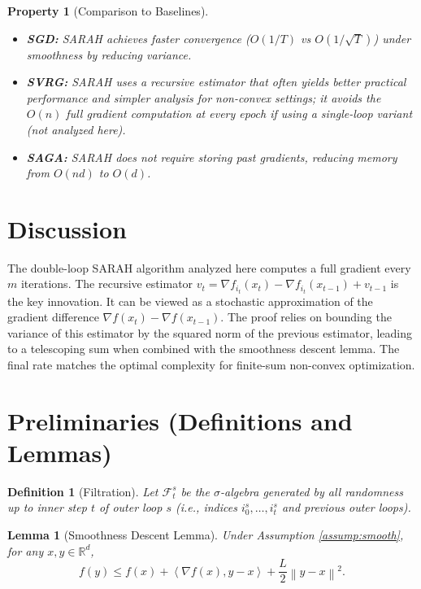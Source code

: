 \documentclass{article}
\newtheorem{lemma}{Lemma}
\newtheorem{definition}{Definition}
\newtheorem{property}{Property}
\newcommand{\R}{\mathbb{R}}
\newcommand{\norm}[1]{\left\| #1 \right\|}
\newcommand{\inner}[2]{\left\langle #1, #2 \right\rangle}
\newcommand{\grad}{\nabla}
\begin{document}
\begin{property}[Comparison to Baselines]
\begin{itemize}
    \item \textbf{SGD:} SARAH achieves faster convergence ($O(1/T)$ vs $O(1/\sqrt{T})$) under smoothness by reducing variance.
    \item \textbf{SVRG:} SARAH uses a recursive estimator that often yields better practical performance and simpler analysis for non-convex settings; it avoids the $O(n)$ full gradient computation at every epoch if using a single-loop variant (not analyzed here).
    \item \textbf{SAGA:} SARAH does not require storing past gradients, reducing memory from $O(nd)$ to $O(d)$.
\end{itemize}
\end{property}

\section*{Discussion}

The double-loop SARAH algorithm analyzed here computes a full gradient every $m$ iterations. The recursive estimator $v_t = \grad f_{i_t}(x_t) - \grad f_{i_t}(x_{t-1}) + v_{t-1}$ is the key innovation. It can be viewed as a stochastic approximation of the gradient difference $\grad f(x_t) - \grad f(x_{t-1})$. The proof relies on bounding the variance of this estimator by the squared norm of the previous estimator, leading to a telescoping sum when combined with the smoothness descent lemma. The final rate matches the optimal complexity for finite-sum non-convex optimization.

\section*{Preliminaries (Definitions and Lemmas)}

\begin{definition}[Filtration]
Let $\mathcal{F}_t^s$ be the $\sigma$-algebra generated by all randomness up to inner step $t$ of outer loop $s$ (i.e., indices $i_0^s, \dots, i_t^s$ and previous outer loops).
\end{definition}

\begin{lemma}[Smoothness Descent Lemma]
\label{lem:descent}
Under Assumption \ref{assump:smooth}, for any $x, y \in \R^d$,
\begin{equation}
    f(y) \le f(x) + \inner{\grad f(x)}{y-x} + \frac{L}{2} \norm{y-x}^2.
\end{equation}
\end{lemma}
\end{document}
